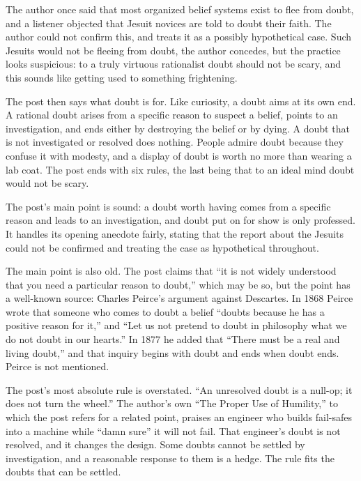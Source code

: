 \begin{afterword}
\summaryhead

The author once said that most organized belief systems exist to flee from doubt, and a listener objected that Jesuit novices are told to doubt their faith. The author could not confirm this, and treats it as a possibly hypothetical case. Such Jesuits would not be fleeing from doubt, the author concedes, but the practice looks suspicious: to a truly virtuous rationalist doubt should not be scary, and this sounds like getting used to something frightening.

The post then says what doubt is for. Like curiosity, a doubt aims at its own end. A rational doubt arises from a specific reason to suspect a belief, points to an investigation, and ends either by destroying the belief or by dying. A doubt that is not investigated or resolved does nothing. People admire doubt because they confuse it with modesty, and a display of doubt is worth no more than wearing a lab coat. The post ends with six rules, the last being that to an ideal mind doubt would not be scary.

\responsehead

The post's main point is sound: a doubt worth having comes from a specific reason and leads to an investigation, and doubt put on for show is only professed. It handles its opening anecdote fairly, stating that the report about the Jesuits could not be confirmed and treating the case as hypothetical throughout.

The main point is also old. The post claims that ``it is not widely understood that you need a particular reason to doubt,'' which may be so, but the point has a well-known source: Charles Peirce's argument against Descartes. In 1868 Peirce wrote that someone who comes to doubt a belief ``doubts because he has a positive reason for it,'' and ``Let us not pretend to doubt in philosophy what we do not doubt in our hearts.'' In 1877 he added that ``There must be a real and living doubt,'' and that inquiry begins with doubt and ends when doubt ends. Peirce is not mentioned.

The post's most absolute rule is overstated. ``An unresolved doubt is a null-op; it does not turn the wheel.'' The author's own ``The Proper Use of Humility,'' to which the post refers for a related point, praises an engineer who builds fail-safes into a machine while ``damn sure'' it will not fail. That engineer's doubt is not resolved, and it changes the design. Some doubts cannot be settled by investigation, and a reasonable response to them is a hedge. The rule fits the doubts that can be settled.


\end{afterword}
